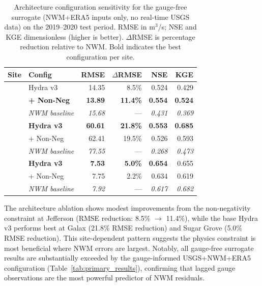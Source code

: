 \documentclass[draft]{agujournal2019}
\begin{document}
\begin{table}
    \centering
    \caption{Architecture configuration sensitivity for the gauge-free surrogate (NWM+ERA5 inputs only, no real-time USGS data) on the 2019--2020 test period. RMSE in m$^3$/s; NSE and KGE dimensionless (higher is better). $\Delta$RMSE is percentage reduction relative to NWM. Bold indicates the best configuration per site.}
    \small
    \begin{tabular}{ll rr rr}
        \toprule
        \textbf{Site} & \textbf{Config} & \textbf{RMSE} & \textbf{$\Delta$RMSE} & \textbf{NSE} & \textbf{KGE} \\
        \midrule
            & Hydra v3 & 14.35 & 8.5\% & 0.524 & 0.429 \\
            & \textbf{+ Non-Neg} & \textbf{13.89} & \textbf{11.4\%} & \textbf{0.554} & \textbf{0.524} \\
            & \textit{NWM baseline} & \textit{15.68} & --- & \textit{0.431} & \textit{0.369} \\
        \midrule
            & \textbf{Hydra v3} & \textbf{60.61} & \textbf{21.8\%} & \textbf{0.553} & \textbf{0.685} \\
            & + Non-Neg & 62.41 & 19.5\% & 0.526 & 0.593 \\
            & \textit{NWM baseline} & \textit{77.55} & --- & \textit{0.268} & \textit{0.473} \\
        \midrule
            & \textbf{Hydra v3} & \textbf{7.53} & \textbf{5.0\%} & \textbf{0.654} & 0.655 \\
            & + Non-Neg & 7.75 & 2.2\% & 0.634 & 0.619 \\
            & \textit{NWM baseline} & \textit{7.92} & --- & \textit{0.617} & \textit{0.682} \\
        \bottomrule
    \end{tabular}
    \label{tab:v3_results}
\end{table}

The architecture ablation shows modest improvements from the non-negativity constraint at Jefferson (RMSE reduction: 8.5\% $\to$ 11.4\%), while the base Hydra v3 performs best at Galax (21.8\% RMSE reduction) and Sugar Grove (5.0\% RMSE reduction). This site-dependent pattern suggests the physics constraint is most beneficial where NWM errors are largest. Notably, all gauge-free surrogate results are substantially exceeded by the gauge-informed USGS+NWM+ERA5 configuration (Table~\ref{tab:primary_results}), confirming that lagged gauge observations are the most powerful predictor of NWM residuals.
\end{document}
